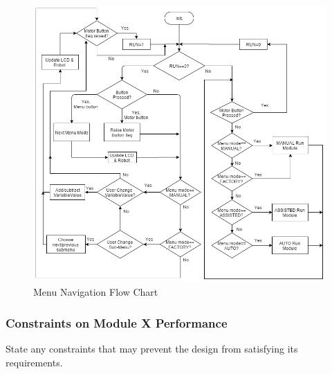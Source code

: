 \documentclass{article}
\begin{document}
			\begin{figure}[h]
				\includegraphics[scale=0.45]{menu_navFlowChart.png}
				\centering
				\caption{Menu Navigation Flow Chart}
			\end{figure}
	
	
	
	\subsubsection{Constraints on Module X Performance}
	State any constraints that may prevent the design from satisfying its requirements.
	
	
	
	
\end{document}
